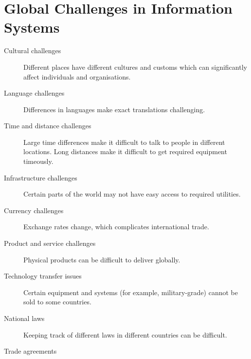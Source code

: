 \documentclass[\main/notes.tex]{subfiles}
\begin{document}
			\section{Global Challenges in Information Systems}
				\begin{description}
					\item[Cultural challenges] Different places have different cultures and customs which can significantly affect individuals and organisations. 
					\item[Language challenges] Differences in languages make exact translations challenging.
					\item[Time and distance challenges] Large time differences make it difficult to talk to people in different locations. Long distances make it difficult to get required equipment timeously.
					\item[Infrastructure challenges] Certain parts of the world may not have easy access to required utilities.
					\item[Currency challenges] Exchange rates change, which complicates international trade.
					\item[Product and service challenges] Physical products can be difficult to deliver globally.
					\item[Technology transfer issues] Certain equipment and systems (for example, military-grade) cannot be sold to some countries.
					\item[National laws] Keeping track of different laws in different countries can be difficult.
					\item[Trade agreements] 
				\end{description}
				\pagebreak
\end{document}
